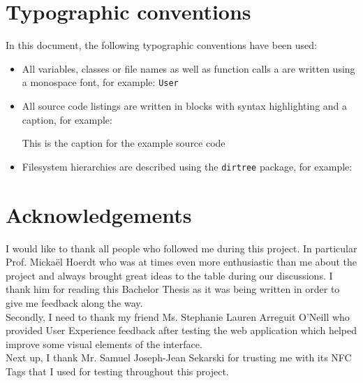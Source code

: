 \documentclass[twoside, openright,11pt,a4paper]{book}
\newenvironment{code}{\captionsetup{type=listing}}{}
\begin{document}
\frontmatter
\pagestyle{plain}



\tableofcontents
\listoffigures
\renewcommand\listoflistingscaption{Source code listings}
\listoflistings
\listoftables
\chapter*{Typographic conventions}
In this document, the following typographic conventions have been used:
\begin{itemize}
	\item All variables, classes or file names as well as function calls a are written using a monospace font, for example: \verb+User+
	\item All source code listings are written in blocks with syntax highlighting and a caption, for example:
	\bigbreak
	\begin{code}
		\caption*{This is the caption for the example source code}
	\end{code}
	\item Filesystem hierarchies are described using the \verb+dirtree+ package, for example:
\end{itemize}
\chapter*{Acknowledgements}
I would like to thank all people who followed me during this project. In particular Prof. Mickaël Hoerdt who was at times even more enthusiastic than me about the project and always brought great ideas to the table during our discussions. I thank him for reading this Bachelor Thesis as it was being written in order to give me feedback along the way. \\

Secondly, I need to thank my friend Ms. Stephanie Lauren Arreguit O'Neill who provided User Experience feedback after testing the web application which helped improve some visual elements of the interface. \\

Next up, I thank Mr. Samuel Joseph-Jean Sekarski for trusting me with its NFC Tags that I used for testing throughout this project.\\
\end{document}
